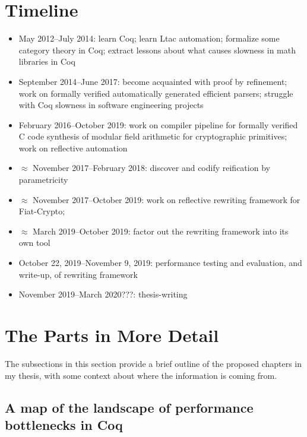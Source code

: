 \documentclass[twoside]{article}
\begin{document}
{\section{Timeline}
\begin{itemize}
  \item
    May 2012--July 2014:
    learn Coq;
    learn Ltac automation;
    formalize some category theory in Coq;
    extract lessons about what causes slowness in math libraries in Coq
  \item
    September 2014--June 2017:
    become acquainted with proof by refinement;
    work on formally verified automatically generated efficient parsers;
    struggle with Coq slowness in software engineering projects
  \item
    February 2016--October 2019:
    work on compiler pipeline for formally verified C code synthesis of modular field arithmetic for cryptographic primitives;
    work on reflective automation
  \item
    $\approx$ November 2017--February 2018:
    discover and codify reification by parametricity
  \item
    $\approx$ November 2017--October 2019:
    work on reflective rewriting framework for Fiat-Crypto;
  \item
    $\approx$ March 2019--October 2019:
    factor out the rewriting framework into its own tool
  \item
    October 22, 2019--November 9, 2019:
    performance testing and evaluation, and write-up, of rewriting framework
  \item
    November 2019--March 2020???:
    thesis-writing
\end{itemize}

\section{The Parts in More Detail}

The subsections in this section provide a brief outline of the proposed chapters in my thesis, with some context about where the information is coming from.

\subsection{A map of the landscape of performance bottlenecks in Coq}

}
\end{document}
